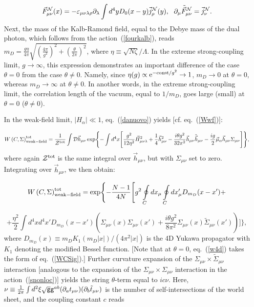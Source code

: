 \documentclass[a4paper,12pt]{article}
\begin{document}
$$
\vec F_{\mu\nu}^{\cal N}(x)=-\varepsilon_{\mu\nu\lambda\rho}\partial_\lambda\int d^4yD_0(x-y)\vec j_\rho^{\cal N}(y),~~
\partial_\mu\tilde{\vec F}_{\mu\nu}^{\cal N}=\vec j_\nu^{\cal N}.$$
Next, the mass of the Kalb-Ramond field, equal to
the Debye mass of the dual photon,
which follows from the action~(\ref{fourkalb}), reads $m_D=\frac{g\eta}{4\pi}\sqrt{\left(\frac{4\pi}{g^2}\right)^2+\left(\frac{\theta}{2\pi}\right)^2}$,
where $\eta\equiv\sqrt{N\zeta}/\Lambda$. In the extreme strong-coupling limit, $g\to\infty$, this expression demonstrates an important
difference of the case $\theta=0$ from the case $\theta\ne 0$. Namely, since $\eta(g)\propto {\rm e}^{-{\rm const}/g^2}\to 1$,
$m_D\to 0$ at $\theta=0$, whereas $m_D\to\infty$ at $\theta\ne 0$. In another words, in the extreme strong-coupling limit, the correlation
length of the vacuum, equal to $1/m_D$, goes large (small) at $\theta=0$ ($\theta\ne 0$).


In the weak-field limit, $\left|H_\alpha\right|\ll 1$, eq.~(\ref{danuovo}) yields [cf. eq.~(\ref{Wwf})]:

$$
W\left(C,\Sigma\right)_{\rm weak-field}^{\rm tot}=\frac{1}{{\cal Z}^{\rm tot}}
\int {\cal D}\vec h_{\mu\nu}
\exp\Biggl\{-\int d^4x\Biggl[\frac{g^2}{12\eta^2}\vec H_{\mu\nu\lambda}^2+
\frac{1}{4}\vec h_{\mu\nu}^2-\frac{i\theta g^2}{32\pi^2}
\vec h_{\mu\nu}\tilde{\vec h}_{\mu\nu}-\frac{ig}{2}\vec\mu_\alpha
\vec h_{\mu\nu}
\Sigma_{\mu\nu}\Biggr]\Biggr\},$$
where again ${\cal Z}^{\rm tot}$ is the same integral over $\vec h_{\mu\nu}$, but with $\Sigma_{\mu\nu}$ set to zero.
Integrating over $\vec h_{\mu\nu}$, we then obtain:

$$W\left(C,\Sigma\right)_{\rm weak-field}^{\rm tot}
=\exp\Biggl\{-\frac{N-1}{4N}\Biggl[g^2\oint\limits_{C}^{}dx_\mu
\oint\limits_{C}^{}dx'_\mu D_{m_D}(x-x')+$$

\begin{equation}
\label{w4d}
+\frac{\eta^2}{2}\int d^4xd^4x'
D_{m_D}(x-x')\left(\Sigma_{\mu\nu}(x)\Sigma_{\mu\nu}(x')+
\frac{i\theta g^2}{8\pi^2}\Sigma_{\mu\nu}(x)\tilde\Sigma_{\mu\nu}(x')
\right)\Biggr]\Biggr\},
\end{equation}
where $D_{m_D}(x)\equiv m_DK_1\left(m_D|x|\right)/(4\pi^2|x|)$ is the 4D Yukawa propagator with $K_1$ denoting the
modified Bessel function. [Note that at $\theta=0$, eq.~(\ref{w4d}) takes the form of eq.~(\ref{WCSig}).]
Further curvature expansion of the
$\Sigma_{\mu\nu}\times\tilde\Sigma_{\mu\nu}$ interaction
[analogous to the expansion of the $\Sigma_{\mu\nu}\times\Sigma_{\mu\nu}$ interaction in the action~(\ref{snonloc})] yields the
string $\theta$-term equal to $ic\nu$. Here,
$\nu\equiv\frac{1}{2\pi}
\int d^2\xi\sqrt{{\sf g}}{\sf g}^{ab}(\partial_a t_{\mu\nu})(\partial_b
\tilde t_{\mu\nu})$ is the number of self-intersections of the
world sheet, and the coupling constant $c$ reads
\end{document}
